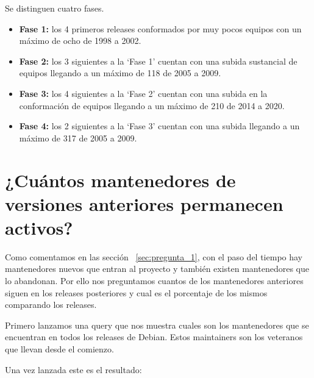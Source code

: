\documentclass[a4paper, 12pt]{book}
\begin{document}
Se distinguen cuatro fases.
\begin{itemize}
	\item  \textbf{Fase 1:} los 4 primeros releases conformados por muy pocos equipos con un máximo de ocho de 1998 a 2002. 
	
	\item  \textbf{Fase 2:} los 3 siguientes a la `Fase 1' cuentan con una subida sustancial de equipos llegando a un máximo de 118 de 2005 a 2009.
	
	\item  \textbf{Fase 3:} los 4 siguientes a la `Fase 2' cuentan con una subida en la conformación de equipos llegando a un máximo de 210 de 2014 a 2020.
	
	\item  \textbf{Fase 4:} los 2 siguientes a la `Fase 3' cuentan con una subida  llegando a un máximo de 317 de 2005 a 2009.
	
\end{itemize}

\section{¿Cuántos mantenedores de versiones anteriores permanecen activos?}
\label{sec:pregunta_3}

Como comentamos en las sección ~\ref{sec:pregunta_1}, con el paso del tiempo hay mantenedores nuevos que entran al proyecto y también existen mantenedores que lo abandonan. Por ello nos preguntamos cuantos de los mantenedores anteriores siguen en los releases posteriores y cual es el porcentaje de los mismos comparando los releases.

Primero lanzamos una query que nos muestra cuales son los mantenedores que se encuentran en todos los releases de Debian. Estos maintainers son los veteranos que llevan desde el comienzo.

Una vez lanzada este es el resultado:
 
\end{document}
